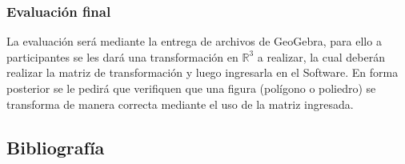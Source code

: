 \subsubsection{Evaluación final}

La evaluación será mediante la entrega de archivos de GeoGebra, para ello a participantes se les dará una transformación en $\mathbb{R}^{3}$ a realizar, la cual deberán realizar la matriz de transformación y luego ingresarla en el Software. En forma posterior se le pedirá que verifiquen que una figura (polígono o poliedro) se transforma de manera correcta mediante el uso de la matriz ingresada.

\subsection{Bibliografía}

\nocite{*}
\printbibliography[keyword={03}]